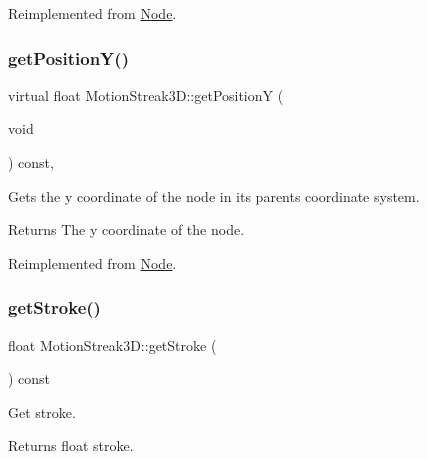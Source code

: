 Reimplemented from \hyperlink{classNode_ae2ab411fb5477789b7b96477b18c0f83}{Node}.

\mbox{\label{classMotionStreak3D_a9880e5a12cec812ba36804232e73bd7b}} 
\subsubsection{\texorpdfstring{get\+Position\+Y()}{getPositionY()}\hspace{0.1cm}{\footnotesize\ttfamily [2/2]}}
{\footnotesize\ttfamily virtual float Motion\+Streak3\+D\+::get\+PositionY (\begin{DoxyParamCaption}\item[{void}]{ }\end{DoxyParamCaption}) const\hspace{0.3cm}{\ttfamily [override]}, {\ttfamily [virtual]}}

Gets the y coordinate of the node in its parent\textquotesingle{}s coordinate system.

\begin{DoxyReturn}{Returns}
The y coordinate of the node. 
\end{DoxyReturn}


Reimplemented from \hyperlink{classNode_ae2ab411fb5477789b7b96477b18c0f83}{Node}.

\mbox{\label{classMotionStreak3D_a6bb96d9a0dceaa6d4fa56b6c93c0a9b0}} 
\subsubsection{\texorpdfstring{get\+Stroke()}{getStroke()}\hspace{0.1cm}{\footnotesize\ttfamily [1/2]}}
{\footnotesize\ttfamily float Motion\+Streak3\+D\+::get\+Stroke (\begin{DoxyParamCaption}{ }\end{DoxyParamCaption}) const\hspace{0.3cm}{\ttfamily [inline]}}

Get stroke.

\begin{DoxyReturn}{Returns}
float stroke. 
\end{DoxyReturn}
\mbox{\label{classMotionStreak3D_a6bb96d9a0dceaa6d4fa56b6c93c0a9b0}} 
